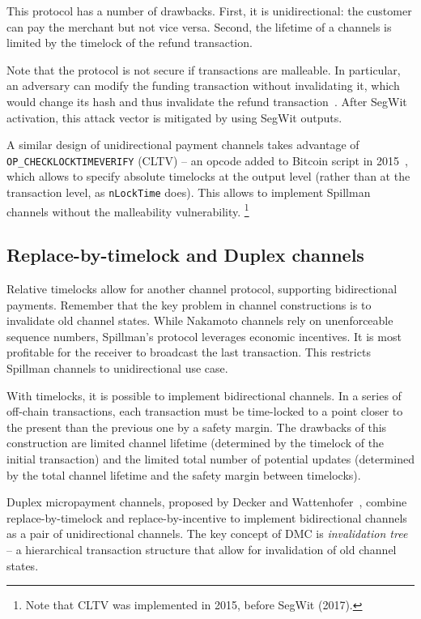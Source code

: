 This protocol has a number of drawbacks.
First, it is unidirectional: the customer can pay the merchant but not vice versa.
Second, the lifetime of a channels is limited by the timelock of the refund transaction.

Note that the protocol is not secure if transactions are malleable.
In particular, an adversary can modify the funding transaction without invalidating it, which would change its hash and thus invalidate the refund transaction~\cite{Harding2016}.
After SegWit activation, this attack vector is mitigated by using SegWit outputs.

A similar design of unidirectional payment channels takes advantage of \texttt{OP\_CHECKLOCKTIMEVERIFY} (CLTV) -- an opcode added to Bitcoin script in 2015~\cite{Todd2014}, which allows to specify absolute timelocks at the output level (rather than at the transaction level, as \texttt{nLockTime} does).
This allows to implement Spillman channels without the malleability vulnerability.
\footnote{Note that CLTV was implemented in 2015, before SegWit (2017).}


\subsection{Replace-by-timelock and Duplex channels}

Relative timelocks allow for another channel protocol, supporting bidirectional payments.
Remember that the key problem in channel constructions is to invalidate old channel states.
While Nakamoto channels rely on unenforceable sequence numbers, Spillman's protocol leverages economic incentives.
It is most profitable for the receiver to broadcast the last transaction.
This restricts Spillman channels to unidirectional use case.

With timelocks, it is possible to implement bidirectional channels.
In a series of off-chain transactions, each transaction must be time-locked to a point closer to the present than the previous one by a safety margin.
The drawbacks of this construction are limited channel lifetime (determined by the timelock of the initial transaction) and the limited total number of potential updates (determined by the total channel lifetime and the safety margin between timelocks).

Duplex micropayment channels, proposed by Decker and Wattenhofer~\cite{Decker2015}, combine replace-by-timelock and replace-by-incentive to implement bidirectional channels as a pair of unidirectional channels.
The key concept of DMC is \textit{invalidation tree} -- a hierarchical transaction structure that allow for invalidation of old channel states.


